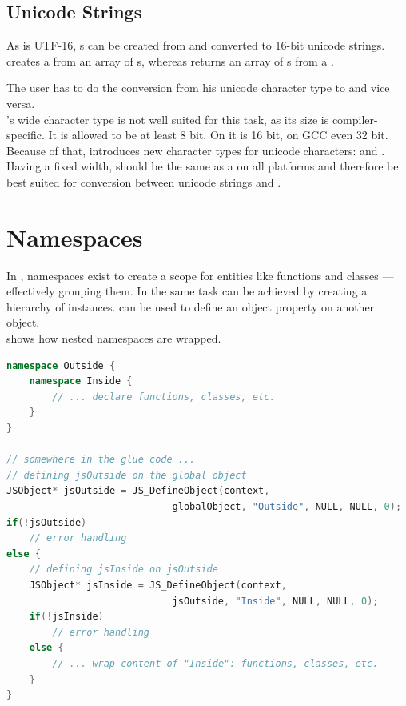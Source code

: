 \subsection{Unicode Strings}

As  is UTF-16, s can be created from and converted to 16-bit unicode strings.\\
 creates a  from an array of s, whereas \linebreak{} returns an array of s from a .

The  user has to do the conversion from his unicode character type to  and vice versa.\\
's wide character type  is not well suited for this task, as its size is compiler-specific. It is allowed to be at least 8 bit. On  it is 16 bit, on GCC even 32 bit.\\
Because of that,  introduces new character types for unicode \linebreak characters:  and . Having a fixed width,  should be the same as a  on all platforms and therefore be best suited for conversion between unicode strings and .

\section{Namespaces}

In , namespaces exist to create a scope for entities like functions and \linebreak classes --- effectively grouping them. In  the same task can be achieved by creating a hierarchy of  instances.  can be used to define an object property on another object.\\  shows how nested namespaces are wrapped.

\SingleSpacing
\begin{lstlisting}[language=C++, caption=Wrapping a namespace, label=lst:WrappingNamespace]
namespace Outside {
	namespace Inside {
		// ... declare functions, classes, etc.
	}
}

// somewhere in the glue code ...
// defining jsOutside on the global object
JSObject* jsOutside = JS_DefineObject(context, 
                             globalObject, "Outside", NULL, NULL, 0);
if(!jsOutside)
	// error handling
else {
	// defining jsInside on jsOutside
	JSObject* jsInside = JS_DefineObject(context, 
                             jsOutside, "Inside", NULL, NULL, 0);
	if(!jsInside)
		// error handling
	else {
		// ... wrap content of "Inside": functions, classes, etc.
	}
}
\end{lstlisting}
\OnehalfSpacing

